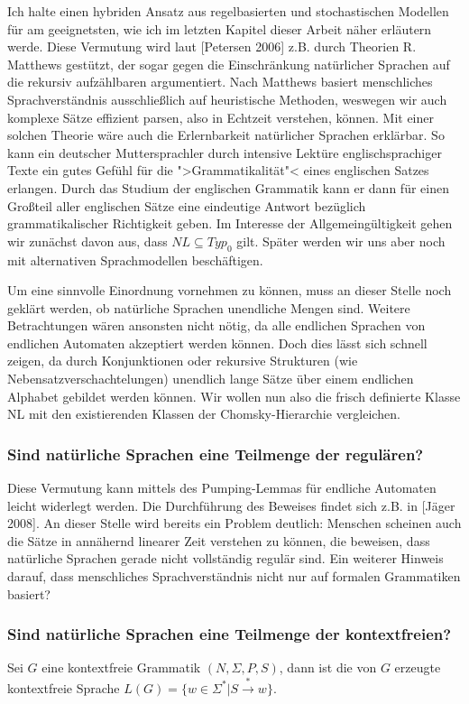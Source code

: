 \documentclass[12pt,a4paper]{article}
\theoremstyle{definition}
\begin{document}
			Ich halte einen hybriden Ansatz aus regelbasierten und stochastischen Modellen für am geeignetsten, wie ich im letzten Kapitel dieser Arbeit näher erläutern werde. Diese Vermutung wird laut [Petersen 2006] z.B. durch Theorien R. Matthews gestützt, der sogar gegen die Einschränkung natürlicher Sprachen auf die rekursiv aufzählbaren argumentiert. Nach Matthews basiert menschliches Sprachverständnis ausschließlich auf heuristische Methoden, weswegen wir auch komplexe Sätze effizient parsen, also in Echtzeit verstehen, können. Mit einer solchen Theorie wäre auch die Erlernbarkeit natürlicher Sprachen erklärbar. So kann ein deutscher Muttersprachler durch intensive Lektüre englischsprachiger Texte ein gutes Gefühl für die ">Grammatikalität"< eines englischen Satzes erlangen. Durch das Studium der englischen Grammatik kann er dann für einen Großteil aller englischen Sätze eine eindeutige Antwort bezüglich grammatikalischer Richtigkeit geben. Im Interesse der Allgemeingültigkeit gehen wir zunächst davon aus, dass $\mathit{NL} \subseteq Typ_0$ gilt. Später werden wir uns aber noch mit alternativen Sprachmodellen beschäftigen.
	
			Um eine sinnvolle Einordnung vornehmen zu können, muss an dieser Stelle noch geklärt werden, ob natürliche Sprachen unendliche Mengen sind. Weitere Betrachtungen wären ansonsten nicht nötig, da alle endlichen Sprachen von endlichen Automaten akzeptiert werden können. Doch dies lässt sich schnell zeigen, da durch Konjunktionen oder rekursive Strukturen (wie Nebensatzverschachtelungen) unendlich lange Sätze über einem endlichen Alphabet gebildet werden können. Wir wollen nun also die frisch definierte Klasse NL mit den existierenden Klassen der Chomsky-Hierarchie vergleichen.
			
		\subsubsection{Sind natürliche Sprachen eine Teilmenge der regulären?}
			Diese Vermutung kann mittels des Pumping-Lemmas für endliche Automaten leicht widerlegt werden. Die Durchführung des Beweises findet sich z.B. in [Jäger 2008]. An dieser Stelle wird bereits ein Problem deutlich: Menschen scheinen auch die Sätze in annähernd linearer Zeit verstehen zu können, die beweisen, dass natürliche Sprachen gerade nicht vollständig regulär sind. Ein weiterer Hinweis darauf, dass menschliches Sprachverständnis nicht nur auf formalen Grammatiken basiert?
			
		\subsubsection{Sind natürliche Sprachen eine Teilmenge der kontextfreien?}
			Sei $G$ eine kontextfreie Grammatik $(N, \Sigma, P, S)$, dann ist die von $G$ erzeugte kontextfreie Sprache $L(G) = \{w \in \Sigma^* | S \xrightarrow{*} w\}$.
			
\end{document}
